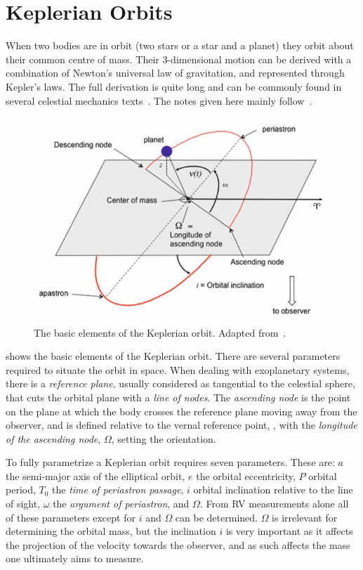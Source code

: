 
\section{Keplerian Orbits}
\label{sec:keplerian_orbits}
When two bodies are in orbit (two stars or a star and a planet) they orbit about their common centre of mass.
Their 3-dimensional motion can be derived with a combination of Newton's universal law of gravitation, and represented through Kepler's laws.
The full derivation is quite long and can be commonly found in several celestial mechanics texts~\citep[e.g.][]{moulton_introduction_1914, perryman_exoplanet_2011, fitzpatrick_introduction_2012}.
The notes given here mainly follow~\citet{bozza_methods_2016}.

\begin{figure}
    \centering
    \includegraphics[width=0.6\linewidth]{figures/fundamental_rv/orbit_diagram2.pdf}
    \caption[The basic elements of the Keplerian orbit.]{The basic elements of the Keplerian orbit.
        Adapted from~\citet{bozza_methods_2016}.}
    \label{fig:orbitdiagram}
\end{figure}

 shows the basic elements of the Keplerian orbit.
There are several parameters required to situate the orbit in space.
When dealing with exoplanetary systems, there is a \textit{reference plane}, usually considered as tangential to the celestial sphere, that cuts the orbital plane with a \textit{line of nodes}.
The \textit{ascending node} is the point on the plane at which the body crosses the reference plane moving away from the observer, and is defined relative to the vernal reference point, \Aries, with the \textit{longitude of the ascending node}, $\Omega$, setting the orientation.

To fully parametrize a Keplerian orbit requires seven parameters.
These are: \(a\) the semi-major axis of the elliptical orbit, \(e\) the orbital eccentricity, \(P\) orbital period, $T_0$ the \emph{time of periastron passage}, \(i\) orbital inclination relative to the line of sight, \(\omega\) the \emph{argument of periastron}, and $\Omega$.
From {RV} measurements alone all of these parameters except for \(i\) and $\Omega$ can be determined.
$\Omega$ is irrelevant for determining the orbital mass, but the inclination \(i\) is very important as it affects the projection of the velocity towards the observer, and as such affects the mass one ultimately aims to measure.

